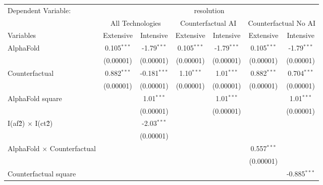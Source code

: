 \begingroup
\centering
\begin{tabular}{lcccccc}
   \tabularnewline \midrule \midrule
   Dependent Variable: & \multicolumn{6}{c}{resolution}\\
 & \multicolumn{2}{c}{All Technologies} & \multicolumn{2}{c}{Counterfactual AI} & \multicolumn{2}{c}{Counterfactual No AI} \\
\cmidrule(lr){1-1}\cmidrule(lr){2-3} \cmidrule(lr){4-5} \cmidrule(lr){6-7}
Variables & \multicolumn{1}{c}{Extensive} & \multicolumn{1}{c}{Intensive} & \multicolumn{1}{c}{Extensive} & \multicolumn{1}{c}{Intensive} & \multicolumn{1}{c}{Extensive} & \multicolumn{1}{c}{Intensive} \\
\cmidrule(lr){1-1}\cmidrule(lr){2-2} \cmidrule(lr){3-3} \cmidrule(lr){4-4} \cmidrule(lr){5-5} \cmidrule(lr){6-6} \cmidrule(lr){7-7}
   AlphaFold                          & 0.105$^{***}$ & -1.79$^{***}$  & 0.105$^{***}$ & -1.79$^{***}$ & 0.105$^{***}$ & -1.79$^{***}$\\   
                                      & (0.00001)     & (0.00001)      & (0.00001)     & (0.00001)     & (0.00001)     & (0.00001)\\   
   Counterfactual                     & 0.882$^{***}$ & -0.181$^{***}$ & 1.10$^{***}$  & 1.01$^{***}$  & 0.882$^{***}$ & 0.704$^{***}$\\   
                                      & (0.00001)     & (0.00001)      & (0.00001)     & (0.00001)     & (0.00001)     & (0.00001)\\   
   AlphaFold square                   &               & 1.01$^{***}$   &               & 1.01$^{***}$  &               & 1.01$^{***}$\\   
                                      &               & (0.00001)      &               & (0.00001)     &               & (0.00001)\\   
   I(af\^2) $\times$ I(ct\^2)         &               & -2.03$^{***}$  &               &               &               &   \\   
                                      &               & (0.00001)      &               &               &               &   \\   
   AlphaFold $\times$ Counterfactual  &               &                &               &               & 0.557$^{***}$ &   \\   
                                      &               &                &               &               & (0.00001)     &   \\   
   Counterfactual square              &               &                &               &               &               & -0.885$^{***}$\\   

\end{tabular}
